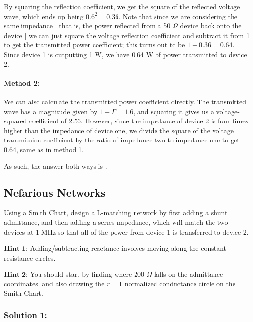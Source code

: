 \documentclass{article}
\begin{document}
By squaring the reflection coefficient, we get the square of the reflected voltage wave, which ends up being $0.6^2 = 0.36$. Note that since we are considering the same impedance | that is, the power reflected from a 50 $\Omega$ device back onto the device | we can just square the voltage reflection coefficient and subtract it from 1 to get the transmitted power coefficient; this turns out to be $1 - 0.36 = 0.64$. Since device 1 is outputting 1 W, we have 0.64 W of power transmitted to device 2. 

\paragraph{Method 2:} We can also calculate the transmitted power coefficient directly. The transmitted wave has a magnitude given by $1 + \Gamma = 1.6$, and squaring it gives us a voltage-squared coefficient of $2.56$. However, since the impedance of device 2 is four times higher than the impedance of device one, we divide the square of the voltage transmission coefficient by the ratio of impedance two to impedance one to get $0.64$, same as in method 1.

\vspace{3mm}

As such, the answer both ways is .


\vfill

\subsection{Nefarious Networks}
Using a Smith Chart, design a L-matching network by first adding a shunt admittance, and then adding a series impedance, which will match the two devices at 1 MHz so that all of the power from device 1 is transferred to device 2. 
\vspace{3mm}

$\textbf{Hint 1:}$ Adding/subtracting reactance involves moving along the constant resistance circles.


\vspace{3mm}

$\textbf{Hint 2:}$ You should start by finding where 200 $\Omega$ falls on the admittance coordinates, and also drawing the $r = 1$ normalized conductance circle on the Smith Chart.

\subsubsection{Solution 1:}
\end{document}
